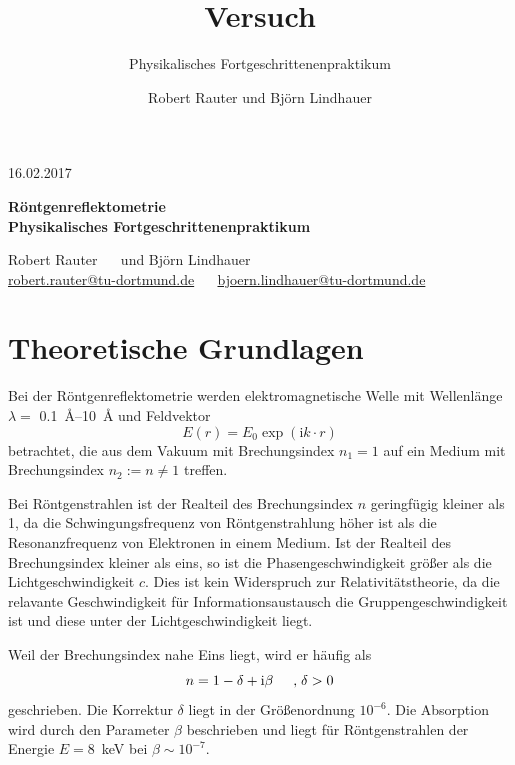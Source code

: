 \documentclass[captions=tableheading]{scrartcl}
\title{Versuch \versuchnummer\\ \versuchname}
\subtitle{Physikalisches Fortgeschrittenenpraktikum}
\author{Robert Rauter und Björn Lindhauer}
\date{\versuchdatum}
\newcommand{\versuchname}{Röntgenreflektometrie}
\newcommand{\versuchdatum}{16.02.2017}
\newcommand{\im}{\mathrm{i}}
\begin{document}
\begin{titlepage}
{\large \versuchdatum}
\vspace{7cm}
\begin{center}
\textbf{\huge \versuchname}\\
\vspace{0.2cm}
\textbf{Physikalisches Fortgeschrittenenpraktikum}\\
\vspace{9cm}

{\Large Robert Rauter \ \ \hspace{1.5cm} und \hspace{1.5cm} Björn Lindhauer}\\
{ \url{robert.rauter@tu-dortmund.de} \ \ \hspace{2cm} \url{bjoern.lindhauer@tu-dortmund.de}}
\end{center}
\end{titlepage}

\section{Theoretische Grundlagen}
Bei der Röntgenreflektometrie werden elektromagnetische Welle mit Wellenlänge \\ 
$\lambda=$ \SIrange{0.1}{10}{\angstrom} und Feldvektor 
\begin{equation}
E\left(r\right)=E_0 \exp\left(\im  k\cdot r \right)
\end{equation}
betrachtet, die aus dem Vakuum mit Brechungsindex $n_1=1$ auf ein Medium mit Brechungsindex $n_2:=n \neq 1$ treffen.

Bei Röntgenstrahlen ist der Realteil des Brechungsindex $n$ geringfügig kleiner als 1, da die Schwingungsfrequenz von Röntgenstrahlung höher ist als die Resonanzfrequenz von Elektronen in einem Medium.
Ist der Realteil des Brechungsindex kleiner als eins, so ist die Phasengeschwindigkeit größer als die Lichtgeschwindigkeit $c$.
Dies ist kein Widerspruch zur Relativitätstheorie, da die relavante Geschwindigkeit für Informationsaustausch die Gruppengeschwindigkeit ist und diese unter der Lichtgeschwindigkeit liegt.

Weil der Brechungsindex nahe Eins liegt, wird er häufig als
\begin{equation}
n=1-\delta + \im\beta \hspace{0.5cm}\text{,}\hspace{0.1cm} \delta >0
\end{equation}
geschrieben. 
Die Korrektur $\delta$ liegt in der Größenordnung $10^{-6}$. 
Die Absorption wird durch den Parameter $\beta$ beschrieben und liegt für Röntgenstrahlen der Energie $E=$\SI{8}{\kilo\eV} bei $\beta \sim 10^{-7}$.
\end{document}
